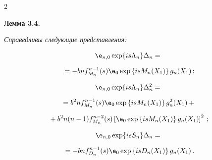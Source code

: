 \begin{multicols}{2}
\smallskip





\noindent


\textbf{Лемма 3.4.}


\textit{Справедливы следующие представления:}


\begin{multline*}


{\e}_{n,0}\exp\{is\Lambda_n\}\Delta_n ={}\\[6pt]


{}= -b n f^{n-1}_{M_n}(s) {\e}_0 \exp\left\{isM_n(X_1)\right\} g_n(X_1)\,;


\end{multline*}


\vspace*{-18pt}





\noindent


\begin{multline*}


{\e}_{n,0}\exp\{is\Lambda_n\}\Delta_n^2 ={}\\[6pt]


{}= b^2 n  f_{M_n}^{n-1}(s)  {\e}_0 \exp\left\{is M_n(X_1)\right\} g_n^2(X_1) +{}\\[6pt]


{}


+ b^2n(n-1) f_{M_n}^{n-2}(s)  \left[{\e}_0 \exp\left\{is M_n(X_1)\right\} g_n(X_1)\right]^2\,;


\end{multline*}


\vspace*{-18pt}





\noindent


\begin{multline*}


{\e}_{n,0}\exp\{isS_n\}\Delta_n ={}\\[6pt]


{}= -b n f^{n-1}_{D_n}(s) {\e}_0 \exp\left\{isD_n(X_1)\right\} g_n(X_1)\,.


\end{multline*}








\medskip






\end{multicols}
